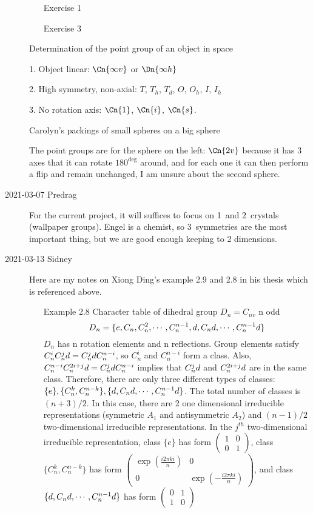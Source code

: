 \begin{description}
\begin{itemize}
\item[Exercise 1]  
\item[Exercise 3]  
\end{itemize}

Determination of the point group of an object in space

1. Object linear: $\Cn{\infty v}$ or $\Dn{\infty h}$

2. High symmetry, non-axial: $T$, $T_h$, $T_d$, $O$, $O_h$, $I$, $I_h$

3. No rotation axis: $\Cn{1}$, $\Cn{i}$, $\Cn{s}$.

Carolyn's packings of small spheres on a big sphere

The point groups are for the sphere on the left: $\Cn{2v}$ because it has
3 axes that it can rotate $180^{\deg}$ around, and for each one it can
then perform a flip and remain unchanged, I am unsure about the second
sphere.
\item[2021-03-07 Predrag]
For the current project, it will suffices to focus on 1\dmn\ and 2\dmn\
crystals (wallpaper groups). Engel is a chemist, so 3\dmn\ symmetries
are the most important thing, but we are good enough keeping to 2 dimensions.

\item[2021-03-13 Sidney]
Here are my notes on Xiong Ding's example 2.9 and 2.8 in his thesis which is referenced above.
\begin{itemize}
\item[Example 2.8] Character table of dihedral group $D_n=C_{nv}$ n odd
$$D_n=\lbrace e, C_n,C_n^2,\cdots,C_n^{n-1},d,C_nd,\cdots , C^{n-1}_nd\rbrace$$
$D_n$ has n rotation elements and n reflections. Group elements satisfy
$C^i_nC^j_nd=C_n^jd C^{n-i}_n$, so $C^i_n$ and $C^{n-i}_n$ form a class.
Also,
$C_n^{n-i}C_n^{2i+j}d=C_n^jd C_n^{n-i}$ implies that
$C^j_nd$ and $C^{2i+j}_nd$
are in the same class. Therefore, there are only three different types of
classes:
\\
$\lbrace e \rbrace ,\lbrace C_n^k,C_n^{n-k}\rbrace,\lbrace
d,C_nd,\cdots,C_n^{n-1}d\rbrace$. The total number of
classes is $(n+3)/2$. In this case, there are 2 one dimensional
irreducible representations (symmetric $A_1$ and antisymmetric $A_2$)
and $(n-1)/2$ two-dimensional irreducible representations. In the
$j^{th}$ two-dimensional irreducible representation, class $\lbrace
e\rbrace$ has form $\begin{pmatrix}
1 & 0\\
0 & 1
\end{pmatrix}$, class $\lbrace C^k_n, C_n^{n-k}\rbrace$ has form $\begin{pmatrix}
\exp(\frac{i2\pi ki}{n}) & 0\\
0 & \exp(-\frac{i2\pi ki}{n})
\end{pmatrix}$, and class $\lbrace d,C_nd,\cdots,C_n^{n-1}d\rbrace$ has form  $\begin{pmatrix}
0 & 1\\
1 & 0
\end{pmatrix}$


\end{itemize}
\end{description}
